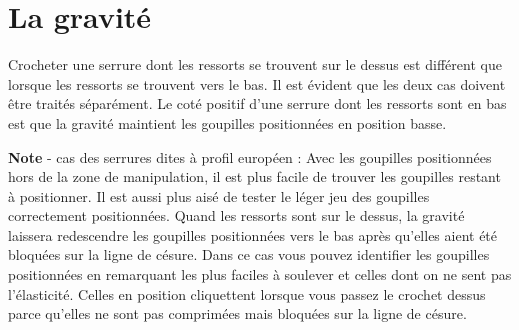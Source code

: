 \documentclass[a4paper,french,11pt,twoside]{report}
\begin{document}
\section{La gravité}

Crocheter une serrure dont les ressorts se trouvent sur le dessus est différent que lorsque les ressorts se trouvent vers le bas. Il est évident que les deux cas doivent être traités séparément. Le coté positif d'une serrure dont les ressorts sont en bas est que la gravité maintient les goupilles positionnées en position basse.

\medskip
\noindent \textbf{Note} - cas des serrures dites à profil européen :
\noindent Avec les goupilles positionnées hors de la zone de manipulation, il est plus facile de trouver les goupilles restant à positionner. Il est aussi plus aisé de tester le léger jeu des goupilles correctement positionnées. Quand les ressorts sont sur le dessus, la gravité laissera redescendre les goupilles positionnées vers le bas après qu'elles aient été bloquées sur la ligne de césure. Dans ce cas vous pouvez identifier les goupilles positionnées en remarquant les plus faciles à soulever et celles dont on ne sent pas l'élasticité. Celles en position cliquettent lorsque vous passez le crochet dessus parce qu'elles ne sont pas comprimées mais bloquées sur la ligne de césure.
\end{document}
